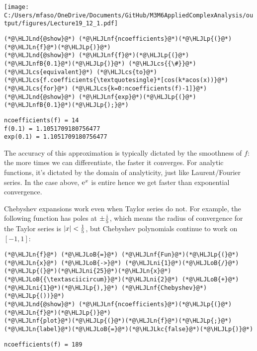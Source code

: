 \documentclass[12pt,a4paper]{article}
\newcommand{\HLJLkc}[1]{\textcolor[RGB]{59,151,46}{\textit{#1}}}
\newcommand{\HLJLn}[1]{#1}
\newcommand{\HLJLnd}[1]{\textcolor[RGB]{214,102,97}{#1}}
\newcommand{\HLJLnf}[1]{\textcolor[RGB]{66,102,213}{#1}}
\newcommand{\HLJLnfB}[1]{\textcolor[RGB]{59,151,46}{#1}}
\newcommand{\HLJLni}[1]{\textcolor[RGB]{59,151,46}{#1}}
\newcommand{\HLJLoB}[1]{\textcolor[RGB]{102,102,102}{\textbf{#1}}}
\newcommand{\HLJLp}[1]{#1}
\newcommand{\HLJLcs}[1]{\textcolor[RGB]{153,153,119}{\textit{#1}}}
\def\I{ {\rm i} }
\def\E{ {\rm e} }
\begin{document}
\texttt{[image: C:/Users/mfaso/OneDrive/Documents/GitHub/M3M6AppliedComplexAnalysis/output/figures/Lecture19\_12\_1.pdf]}

\begin{lstlisting}
(*@\HLJLnd{@show}@*) (*@\HLJLnf{ncoefficients}@*)(*@\HLJLp{(}@*)(*@\HLJLn{f}@*)(*@\HLJLp{)}@*)
(*@\HLJLnd{@show}@*) (*@\HLJLnf{f}@*)(*@\HLJLp{(}@*)(*@\HLJLnfB{0.1}@*)(*@\HLJLp{)}@*) (*@\HLJLcs{{\#}}@*) (*@\HLJLcs{equivalent}@*) (*@\HLJLcs{to}@*) (*@\HLJLcs{f.coefficients{\textquotesingle}*[cos(k*acos(x))}@*) (*@\HLJLcs{for}@*) (*@\HLJLcs{k=0:ncoefficients(f)-1]}@*)
(*@\HLJLnd{@show}@*) (*@\HLJLnf{exp}@*)(*@\HLJLp{(}@*)(*@\HLJLnfB{0.1}@*)(*@\HLJLp{);}@*)
\end{lstlisting}

\begin{lstlisting}
ncoefficients(f) = 14
f(0.1) = 1.1051709180756477
exp(0.1) = 1.1051709180756477
\end{lstlisting}


The accuracy of this approximation is typically dictated by the smoothness of $f$: the more times we can differentiate, the faster it converges. For analytic functions, it's dictated by the domain of analyticity, just like Laurent/Fourier series. In the case above, $\E^x$ is entire hence we get faster than exponential convergence.

Chebyshev expansions work even when Taylor series do not. For example, the following function has poles at $\pm {\I \over 5}$, which means the radius of convergence for the Taylor series is $|x| < {1 \over 5}$, but Chebyshev polynomials continue to work on $[-1,1]$:


\begin{lstlisting}
(*@\HLJLn{f}@*) (*@\HLJLoB{=}@*) (*@\HLJLnf{Fun}@*)(*@\HLJLp{(}@*) (*@\HLJLn{x}@*) (*@\HLJLoB{->}@*) (*@\HLJLni{1}@*)(*@\HLJLoB{/}@*)(*@\HLJLp{(}@*)(*@\HLJLni{25}@*)(*@\HLJLn{x}@*)(*@\HLJLoB{{\textasciicircum}}@*)(*@\HLJLni{2}@*) (*@\HLJLoB{+}@*) (*@\HLJLni{1}@*)(*@\HLJLp{),}@*) (*@\HLJLnf{Chebyshev}@*)(*@\HLJLp{())}@*)
(*@\HLJLnd{@show}@*) (*@\HLJLnf{ncoefficients}@*)(*@\HLJLp{(}@*)(*@\HLJLn{f}@*)(*@\HLJLp{)}@*)
(*@\HLJLnf{plot}@*)(*@\HLJLp{(}@*)(*@\HLJLn{f}@*)(*@\HLJLp{;}@*)(*@\HLJLn{label}@*)(*@\HLJLoB{=}@*)(*@\HLJLkc{false}@*)(*@\HLJLp{)}@*)
\end{lstlisting}

\begin{lstlisting}
ncoefficients(f) = 189
\end{lstlisting}
\end{document}
